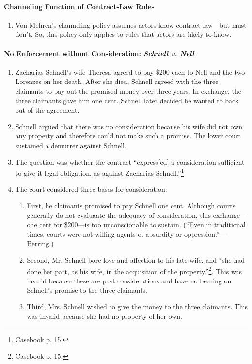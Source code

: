 \paragraph{Channeling Function of Contract-Law Rules}

\begin{enumerate}
    \item Von Mehren's channeling policy assumes actors know contract 
    law---but must don't. So, this policy only applies to rules that actors 
    are likely to know. 
\end{enumerate}

\paragraph{No Enforcement without Consideration: \emph{Schnell v. Nell}}

\begin{enumerate}
    \item Zacharias Schnell's wife Theresa agreed to pay \$200 each to Nell and 
    the two Lorenzes on her death. After she died, Schnell agreed with the 
    three claimants to pay out the promised money over three years. In 
    exchange, the three claimants gave him one cent. Schnell later decided he 
    wanted to back out of the agreement.
    \item Schnell argued that there was no consideration because his wife did 
    not own any property and therefore could not make such a promise. The 
    lower court sustained a demurrer against Schnell.
    \item The question was whether the contract ``express[ed] a consideration 
    sufficient to give it legal obligation, as against Zacharias 
    Schnell.''\footnote{Casebook p. 15.}
    \item The court considered three bases for consideration:
    \begin{enumerate}
        \item First, he claimants promised to pay Schnell one cent. Although 
        courts generally do not evaluaate the adequacy of consideration, this 
        exchange---one cent for \$200---is too unconscionable to 
        sustain. (``Even in traditional times, courts were not willing agents 
        of absurdity or oppression.''---Berring.)
        \item Second, Mr. Schnell bore love and affection to his late wife, 
        and ``she had done her part, as his wife, in the acquisition of the 
        property.''\footnote{Casebook p. 15.}. This was invalid because these 
        are past considerations and have no bearing on Schnell's promise to 
        the three claimants.
        \item Third, Mrs. Schnell wished to give the money to the three 
        claimants. This was invalid because she had no property of her own.
    \end{enumerate}
\end{enumerate}

